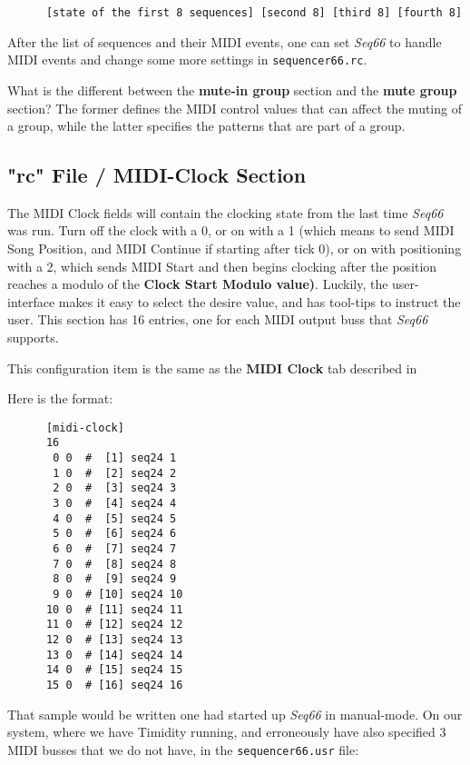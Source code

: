    \begin{verbatim}
      [state of the first 8 sequences] [second 8] [third 8] [fourth 8]
   \end{verbatim}

   After the list of sequences and their MIDI events, one can 
   set \textsl{Seq66} to handle MIDI events and change some more settings
   in \texttt{sequencer66.rc}.

   What is the different between the \textbf{mute-in group}
   section and the \textbf{mute group} section?  The former defines the MIDI
   control values that can affect the muting of a group, while the latter
   specifies the patterns that are part of a group.

\subsection{"rc" File / MIDI-Clock Section}
\label{subsec:seq66_rc_file_midi_clock}

   The MIDI Clock fields will contain the clocking state from the last 
   time \textsl{Seq66} was run.  Turn off the clock with a 0, or on
   with a 1 (which means to send MIDI Song Position, and MIDI Continue if
   starting after tick 0), or on with positioning with a 2, which sends MIDI
   Start and then begins clocking after the position reaches a modulo of the
   \textbf{Clock Start Modulo value)}.  Luckily, the user-interface makes it
   easy to select the desire value, and has tool-tips to instruct the user.
   This section has 16 entries, one for each MIDI output buss that
   \textsl{Seq66} supports.

   This configuration item is the same as the 
   \textbf{MIDI Clock} tab described in
   
   Here is the format:

   \begin{verbatim}
      [midi-clock]
      16
       0 0  #  [1] seq24 1
       1 0  #  [2] seq24 2
       2 0  #  [3] seq24 3
       3 0  #  [4] seq24 4
       4 0  #  [5] seq24 5
       5 0  #  [6] seq24 6
       6 0  #  [7] seq24 7
       7 0  #  [8] seq24 8
       8 0  #  [9] seq24 9
       9 0  # [10] seq24 10
      10 0  # [11] seq24 11
      11 0  # [12] seq24 12
      12 0  # [13] seq24 13
      13 0  # [14] seq24 14
      14 0  # [15] seq24 15
      15 0  # [16] seq24 16
   \end{verbatim}

   That sample would be written one had started up \textsl{Seq66} in
   manual-mode.  On our system, where we have Timidity running, and
   erroneously have also specified 3 MIDI busses that we do not have, in the
   \texttt{sequencer66.usr} file:

